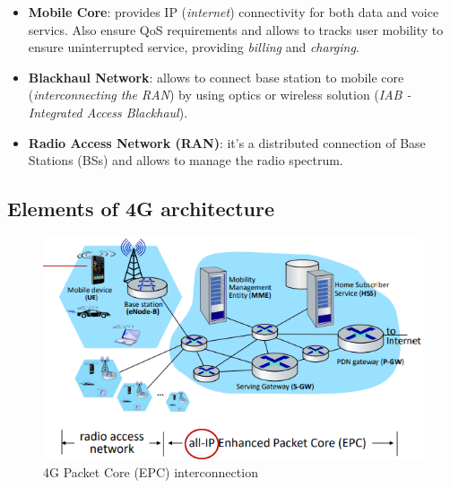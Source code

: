 \documentclass[10pt,a4paper]{report}
\theoremstyle{definition}
\begin{document}
\begin{itemize}
	\item 
	\textbf{Mobile Core}: provides IP (\textit{internet}) connectivity for both data and voice servics. Also ensure QoS requirements and allows to tracks user mobility to ensure uninterrupted service, providing \textit{billing} and \textit{charging}.
	\item 
	\textbf{Blackhaul Network}: allows to connect base station to mobile core (\textit{interconnecting the RAN}) by using optics or wireless solution (\textit{IAB - Integrated Access Blackhaul}).
	\item 
	\textbf{Radio Access Network (RAN)}: it's a distributed connection of Base Stations (BSs) and allows to manage the radio spectrum.
\end{itemize}
\subsection{Elements of 4G architecture}\label{sec:elements-of-4g-architecture}
\begin{figure}[h]
	\centering
	\includegraphics[scale=0.60]{images/Pasted image 20230309160614.png}
	\caption{4G Packet Core (EPC) interconnection}
	\label{}
\end{figure}
\end{document}
